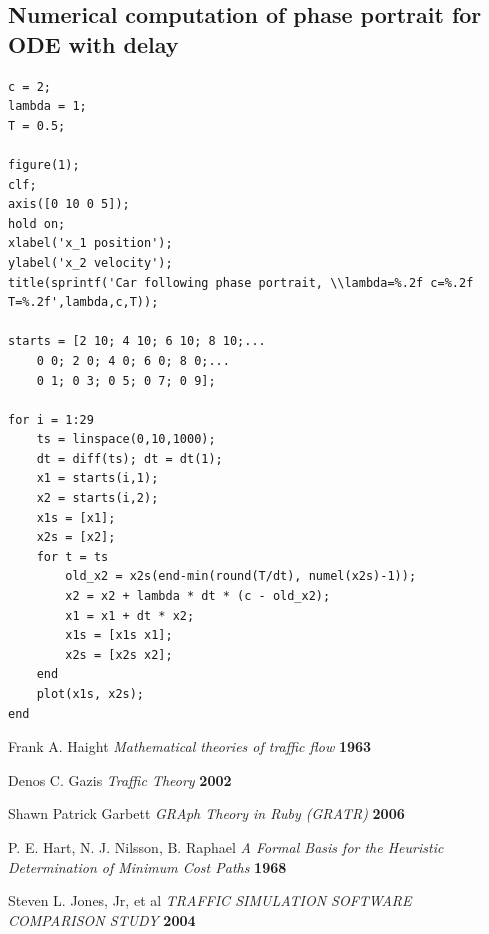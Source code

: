 \documentclass[11pt,a4paper]{article}
\begin{document}
\subsection{Numerical computation of phase portrait for ODE with delay}
\begin{verbatim}
c = 2;
lambda = 1;
T = 0.5;

figure(1);
clf;
axis([0 10 0 5]);
hold on;
xlabel('x_1 position');
ylabel('x_2 velocity');
title(sprintf('Car following phase portrait, \\lambda=%.2f c=%.2f T=%.2f',lambda,c,T));

starts = [2 10; 4 10; 6 10; 8 10;...
    0 0; 2 0; 4 0; 6 0; 8 0;...
    0 1; 0 3; 0 5; 0 7; 0 9];

for i = 1:29
    ts = linspace(0,10,1000);
    dt = diff(ts); dt = dt(1);
    x1 = starts(i,1);
    x2 = starts(i,2);
    x1s = [x1];
    x2s = [x2];
    for t = ts
        old_x2 = x2s(end-min(round(T/dt), numel(x2s)-1));
        x2 = x2 + lambda * dt * (c - old_x2);
        x1 = x1 + dt * x2;
        x1s = [x1s x1];
        x2s = [x2s x2];
    end
    plot(x1s, x2s);
end
\end{verbatim}

\begin{thebibliography}{99}
 Frank A. Haight
{\it Mathematical theories of traffic flow} {\bf 1963}

 Denos C. Gazis
{\it Traffic Theory} {\bf 2002}

 Shawn Patrick Garbett
{\it GRAph Theory in Ruby (GRATR)} {\bf 2006}

 P. E. Hart, N. J. Nilsson, B. Raphael
{\it A Formal Basis for the Heuristic Determination of Minimum Cost Paths} {\bf 1968}

 Steven L. Jones, Jr, et al
{\it TRAFFIC SIMULATION SOFTWARE COMPARISON STUDY} {\bf 2004}

\end{thebibliography}
\end{document}
